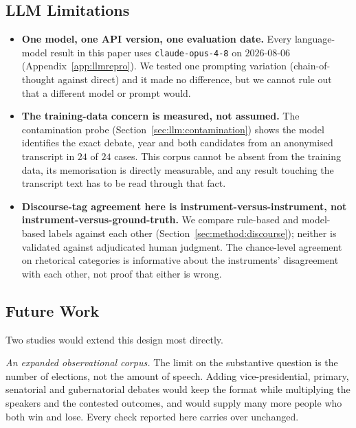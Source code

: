 \documentclass[journal]{IEEEtran}
\begin{document}
\subsection{LLM Limitations}
\begin{itemize}\itemsep2pt
  \item \textbf{One model, one API version, one evaluation date.} Every
        language-model result in this paper uses \texttt{claude-opus-4-8}
        on $2026$-$08$-$06$ (Appendix~\ref{app:llmrepro}). We tested one
        prompting variation (chain-of-thought against direct) and it made
        no difference, but we cannot rule out that a different model or
        prompt would.
  \item \textbf{The training-data concern is measured, not assumed.} The
        contamination probe (Section~\ref{sec:llm:contamination}) shows the
        model identifies the exact debate, year and both candidates from an
        anonymised transcript in $24$ of $24$ cases. This corpus cannot be
        absent from the training data, its memorisation is directly
        measurable, and any result touching the transcript text has to be
        read through that fact.
  \item \textbf{Discourse-tag agreement here is instrument-versus-instrument,
        not instrument-versus-ground-truth.} We compare rule-based and
        model-based labels against each other
        (Section~\ref{sec:method:discourse}); neither is validated against
        adjudicated human judgment. The chance-level agreement on
        rhetorical categories is informative about the instruments'
        disagreement with each other, not proof that either is wrong.
\end{itemize}

\subsection{Future Work}
\label{sec:concl:future}

Two studies would extend this design most directly.

\emph{An expanded observational corpus.} The limit on the substantive
question is the number of elections, not the amount of speech. Adding
vice-presidential, primary, senatorial and gubernatorial debates would keep
the format while multiplying the speakers and the contested outcomes, and
would supply many more people who both win and lose. Every check reported
here carries over unchanged.
\end{document}
